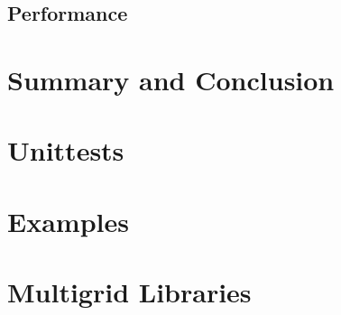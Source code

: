 \documentclass[x11names,twoside,english]{uiofysmaster}
\begin{document}
	\section{Performance}
    
    
    

\chapter{Summary and Conclusion}
	\label{sec:summ}
	


%
\appendix
%     
%
%     
%
\chapter{Unittests}
    
%
\chapter{Examples}
    
%     
\chapter{Multigrid Libraries}
    

%     


%
\printbibliography
\end{document}
